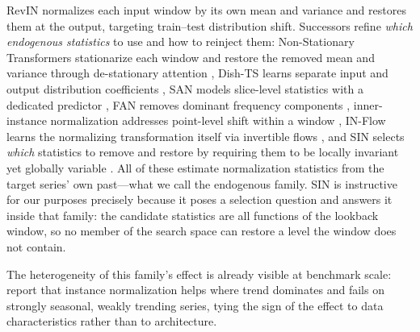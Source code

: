 RevIN \citep{kim2022revin} normalizes each input window by its own mean and variance and restores them at the output, targeting train--test distribution shift. Successors refine \emph{which endogenous statistics} to use and how to reinject them: Non-Stationary Transformers stationarize each window and restore the removed mean and variance through de-stationary attention \citep{liu2022nonstationary}, Dish-TS learns separate input and output distribution coefficients \citep{fan2023dishts}, SAN models slice-level statistics with a dedicated predictor \citep{liu2023san}, FAN removes dominant frequency components \citep{ye2024fan}, inner-instance normalization addresses point-level shift within a window \citep{inner2025instance}, IN-Flow learns the normalizing transformation itself via invertible flows \citep{inflow2024}, and SIN selects \emph{which} statistics to remove and restore by requiring them to be locally invariant yet globally variable \citep{han2024sin}. All of these estimate normalization statistics from the target series' own past---what we call the endogenous family. SIN is instructive for our purposes precisely because it poses a selection question and answers it inside that family: the candidate statistics are all functions of the lookback window, so no member of the search space can restore a level the window does not contain.

The heterogeneity of this family's effect is already visible at benchmark scale: \citet{zhang2024probts} report that instance normalization helps where trend dominates and fails on strongly seasonal, weakly trending series, tying the sign of the effect to data characteristics rather than to architecture.

